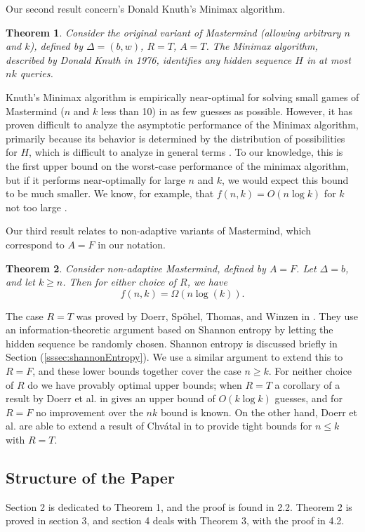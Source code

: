 \documentclass[12pt, a4paper]{article}
\newtheorem{theorem}{Theorem}
\begin{document}
Our second result concern's Donald Knuth's Minimax algorithm.
\begin{theorem}\label{minimaxTheorem}
	Consider the original variant of Mastermind (allowing arbitrary $n$ and $k$), defined by $\Delta=(b, w)$, $R=T$, $A=T$. The Minimax algorithm, described by Donald Knuth in 1976, identifies any hidden sequence $H$ in at most $nk$ queries.
\end{theorem}
Knuth's Minimax algorithm is empirically near-optimal for solving small games of Mastermind ($n$ and $k$ less than 10) in as few guesses as possible. However, it has proven difficult to analyze the asymptotic performance of the Minimax algorithm, primarily because its behavior is determined by the distribution of possibilities for $H$, which is difficult to analyze in general terms \cite{KT86, OS13}. To our knowledge, this is the first upper bound on the worst-case performance of the minimax algorithm, but if it performs near-optimally for large $n$ and $k$, we would expect this bound to be much smaller. We know, for example, that $f(n,k) = O(n \log k)$ for $k$ not too large \cite{DK76, KT86}.

Our third result relates to non-adaptive variants of Mastermind, which correspond to $A=F$ in our notation.
\begin{theorem}\label{nonAdaptiveTheorem}
Consider non-adaptive Mastermind, defined by $A=F$. Let $\Delta = b$, and let $k \geq n$. Then for either choice of $R$, we have
	\begin{equation*}
		f(n, k) = \Omega\left( n\log(k)\right).
	\end{equation*}
\end{theorem}
The case $R = T$ was proved by Doerr, Sp\"ohel, Thomas, and Winzen in \cite{DS13}. They use an information-theoretic argument based on Shannon entropy by letting the hidden sequence be randomly chosen. Shannon entropy is discussed briefly in Section (\ref{sssec:shannonEntropy}).
We use a similar argument to extend this to $R = F$, and
these lower bounds together cover the case $n \geq k$. For neither choice of $R$ do we have provably optimal upper bounds; when $R = T$ a corollary of a result by Doerr et al. in \cite{DS13} gives an upper bound of $O(k \log k)$ guesses, and for $R = F$ no improvement over the $nk$ bound is known. On the other hand, Doerr et al. are able to extend a result of Chv\'atal in \cite{VC83} to provide tight bounds for $n \le k$ with $R = T$.
\subsection{Structure of the Paper}
Section 2 is dedicated to Theorem 1, and the proof is found in 2.2. Theorem 2 is proved in section 3, and section 4 deals with Theorem 3, with the proof in 4.2.
\end{document}
